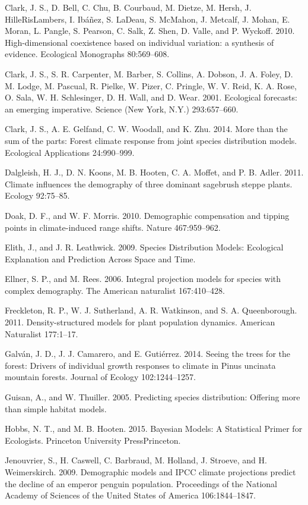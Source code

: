 \documentclass[12pt,]{article}
\begin{document}
Clark, J. S., D. Bell, C. Chu, B. Courbaud, M. Dietze, M. Hersh, J.
HilleRisLambers, I. Ibáñez, S. LaDeau, S. McMahon, J. Metcalf, J. Mohan,
E. Moran, L. Pangle, S. Pearson, C. Salk, Z. Shen, D. Valle, and P.
Wyckoff. 2010. High-dimensional coexistence based on individual
variation: a synthesis of evidence. Ecological Monographs 80:569--608.

Clark, J. S., S. R. Carpenter, M. Barber, S. Collins, A. Dobson, J. A.
Foley, D. M. Lodge, M. Pascual, R. Pielke, W. Pizer, C. Pringle, W. V.
Reid, K. A. Rose, O. Sala, W. H. Schlesinger, D. H. Wall, and D. Wear.
2001. Ecological forecasts: an emerging imperative. Science (New York,
N.Y.) 293:657--660.

Clark, J. S., A. E. Gelfand, C. W. Woodall, and K. Zhu. 2014. More than
the sum of the parts: Forest climate response from joint species
distribution models. Ecological Applications 24:990--999.

Dalgleish, H. J., D. N. Koons, M. B. Hooten, C. A. Moffet, and P. B.
Adler. 2011. Climate influences the demography of three dominant
sagebrush steppe plants. Ecology 92:75--85.

Doak, D. F., and W. F. Morris. 2010. Demographic compensation and
tipping points in climate-induced range shifts. Nature 467:959--962.

Elith, J., and J. R. Leathwick. 2009. Species Distribution Models:
Ecological Explanation and Prediction Across Space and Time.

Ellner, S. P., and M. Rees. 2006. Integral projection models for species
with complex demography. The American naturalist 167:410--428.

Freckleton, R. P., W. J. Sutherland, A. R. Watkinson, and S. A.
Queenborough. 2011. Density-structured models for plant population
dynamics. American Naturalist 177:1--17.

Galván, J. D., J. J. Camarero, and E. Gutiérrez. 2014. Seeing the trees
for the forest: Drivers of individual growth responses to climate in
Pinus uncinata mountain forests. Journal of Ecology 102:1244--1257.

Guisan, A., and W. Thuiller. 2005. Predicting species distribution:
Offering more than simple habitat models.

Hobbs, N. T., and M. B. Hooten. 2015. Bayesian Models: A Statistical
Primer for Ecologists. Princeton University PressPrinceton.

Jenouvrier, S., H. Caswell, C. Barbraud, M. Holland, J. Stroeve, and H.
Weimerskirch. 2009. Demographic models and IPCC climate projections
predict the decline of an emperor penguin population. Proceedings of the
National Academy of Sciences of the United States of America
106:1844--1847.
\end{document}
